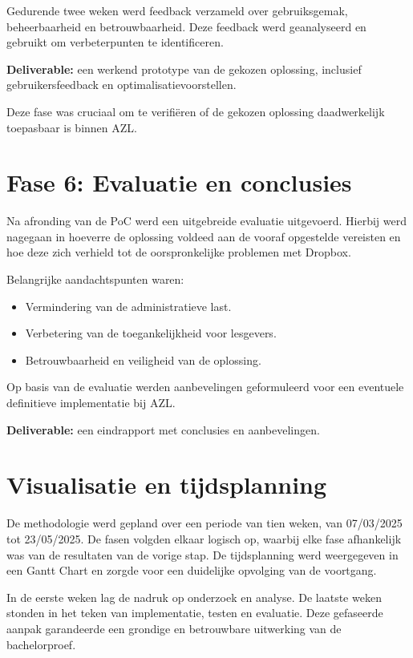 Gedurende twee weken werd feedback verzameld over gebruiksgemak, beheerbaarheid en betrouwbaarheid. Deze feedback werd geanalyseerd en gebruikt om verbeterpunten te identificeren.

\textbf{Deliverable:} een werkend prototype van de gekozen oplossing, inclusief gebruikersfeedback en optimalisatievoorstellen.

Deze fase was cruciaal om te verifiëren of de gekozen oplossing daadwerkelijk toepasbaar is binnen AZL.

\section{Fase 6: Evaluatie en conclusies}
Na afronding van de PoC werd een uitgebreide evaluatie uitgevoerd. Hierbij werd nagegaan in hoeverre de oplossing voldeed aan de vooraf opgestelde vereisten en hoe deze zich verhield tot de oorspronkelijke problemen met Dropbox.

Belangrijke aandachtspunten waren:
\begin{itemize}
    \item Vermindering van de administratieve last.
    \item Verbetering van de toegankelijkheid voor lesgevers.
    \item Betrouwbaarheid en veiligheid van de oplossing.
\end{itemize}

Op basis van de evaluatie werden aanbevelingen geformuleerd voor een eventuele definitieve implementatie bij AZL.

\textbf{Deliverable:} een eindrapport met conclusies en aanbevelingen.

\section{Visualisatie en tijdsplanning}
De methodologie werd gepland over een periode van tien weken, van 07/03/2025 tot 23/05/2025. De fasen volgden elkaar logisch op, waarbij elke fase afhankelijk was van de resultaten van de vorige stap. De tijdsplanning werd weergegeven in een Gantt Chart en zorgde voor een duidelijke opvolging van de voortgang.

In de eerste weken lag de nadruk op onderzoek en analyse. De laatste weken stonden in het teken van implementatie, testen en evaluatie. Deze gefaseerde aanpak garandeerde een grondige en betrouwbare uitwerking van de bachelorproef.